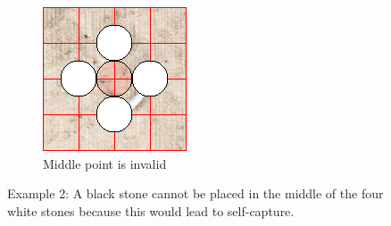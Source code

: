 \documentclass{l4proj}
\begin{document}
\begin{figure}[!h]
\centering
\begin{subfigure}[b]{0.45\textwidth}
\includegraphics[width=\textwidth]{ex/Ex2-0.png}
\caption{Middle point is invalid}
\label{fig:ex2-0}
\end{subfigure}
\caption{Example 2: A black stone cannot be placed in the middle of the four white stones because this would lead to self-capture.}
\label{fig:ex2}
\end{figure}
\end{document}
